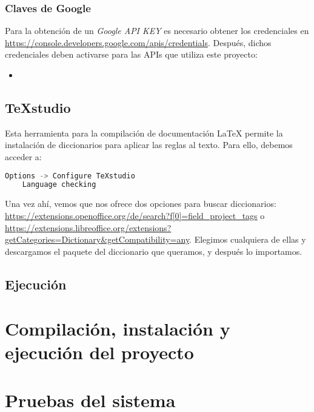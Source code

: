 \subsubsection{Claves de Google}
Para la obtención de un \textit{Google API KEY} es necesario obtener los credenciales en  \url{https://console.developers.google.com/apis/credentials}.
Después, dichos credenciales deben activarse para las APIs que utiliza este proyecto:
\begin{itemize}
	\item 
\end{itemize}

\subsection{\TeX studio}
Esta herramienta para la compilación de documentación \LaTeX{} permite la instalación de diccionarios para aplicar las reglas al texto. Para ello, debemos acceder a:
\begin{lstlisting}[language=bash,caption={Añadir diccionario}]
	Options -> Configure TeXstudio
	Language checking
\end{lstlisting}
Una vez ahí, vemos que nos ofrece dos opciones para buscar diccionarios: \url{https://extensions.openoffice.org/de/search?f[0]=field_project_tags} o \url{https://extensions.libreoffice.org/extensions?getCategories=Dictionary&getCompatibility=any}. Elegimos cualquiera de ellas y descargamos el paquete del diccionario que queramos, y después lo importamos.


\subsection{Ejecución}

\section{Compilación, instalación y ejecución del proyecto}


\section{Pruebas del sistema}
